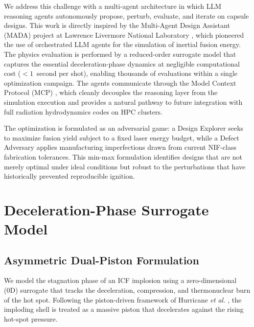 \documentclass[conference]{IEEEtran}
\begin{document}
We address this challenge with a multi-agent architecture in which LLM reasoning agents autonomously propose, perturb, evaluate, and iterate on capsule designs.  This work is directly inspired by the Multi-Agent Design Assistant (MADA) project at Lawrence Livermore National Laboratory \cite{shachar2025}, which pioneered the use of orchestrated LLM agents for the simulation of inertial fusion energy.  The physics evaluation is performed by a reduced-order surrogate model that captures the essential deceleration-phase dynamics at negligible computational cost ($<1$~second per shot), enabling thousands of evaluations within a single optimization campaign.  The agents communicate through the Model Context Protocol (MCP) \cite{mcp2024}, which cleanly decouples the reasoning layer from the simulation execution and provides a natural pathway to future integration with full radiation hydrodynamics codes on HPC clusters.

The optimization is formulated as an adversarial game: a Design Explorer seeks to maximize fusion yield subject to a fixed laser energy budget, while a Defect Adversary applies manufacturing imperfections drawn from current NIF-class fabrication tolerances.  This min-max formulation identifies designs that are not merely optimal under ideal conditions but robust to the perturbations that have historically prevented reproducible ignition.

\section{Deceleration-Phase Surrogate Model}
\label{sec:model}

\subsection{Asymmetric Dual-Piston Formulation}

We model the stagnation phase of an ICF implosion using a zero-dimensional (0D) surrogate that tracks the deceleration, compression, and thermonuclear burn of the hot spot.  Following the piston-driven framework of Hurricane \textit{et al.} \cite{hurricane2014}, the imploding shell is treated as a massive piston that decelerates against the rising hot-spot pressure.
\end{document}
